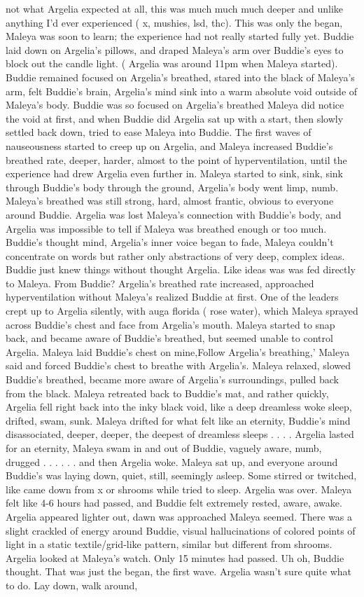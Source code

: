 \documentclass[12pt]{book}
\begin{document}
not what Argelia expected at all, this was much much much deeper and unlike anything I'd ever experienced ( x, mushies, lsd, thc). This was only the began, Maleya was soon to learn; the experience had not really started fully yet. Buddie laid down on Argelia's pillows, and draped Maleya's arm over Buddie's eyes to block out the candle light. ( Argelia was around 11pm when Maleya started). Buddie remained focused on Argelia's breathed, stared into the black of Maleya's arm, felt Buddie's brain, Argelia's mind sink into a warm absolute void outside of Maleya's body. Buddie was so focused on Argelia's breathed Maleya did notice the void at first, and when Buddie did Argelia sat up with a start, then slowly settled back down, tried to ease Maleya into Buddie. The first waves of nauseousness started to creep up on Argelia, and Maleya increased Buddie's breathed rate, deeper, harder, almost to the point of hyperventilation, until the experience had drew Argelia even further in. Maleya started to sink, sink, sink through Buddie's body through the ground, Argelia's body went limp, numb. Maleya's breathed was still strong, hard, almost frantic, obvious to everyone around Buddie. Argelia was lost Maleya's connection with Buddie's body, and Argelia was impossible to tell if Maleya was breathed enough or too much. Buddie's thought mind, Argelia's inner voice began to fade, Maleya couldn't concentrate on words but rather only abstractions of very deep, complex ideas. Buddie just knew things without thought Argelia. Like ideas was was fed directly to Maleya. From Buddie? Argelia's breathed rate increased, approached hyperventilation without Maleya's realized Buddie at first. One of the leaders crept up to Argelia silently, with auga florida ( rose water), which Maleya sprayed across Buddie's chest and face from Argelia's mouth. Maleya started to snap back, and became aware of Buddie's breathed, but seemed unable to control Argelia. Maleya laid Buddie's chest on mine,Follow Argelia's breathing,' Maleya said and forced Buddie's chest to breathe with Argelia's. Maleya relaxed, slowed Buddie's breathed, became more aware of Argelia's surroundings, pulled back from the black. Maleya retreated back to Buddie's mat, and rather quickly, Argelia fell right back into the inky black void, like a deep dreamless woke sleep, drifted, swam, sunk. Maleya drifted for what felt like an eternity, Buddie's mind disassociated, deeper, deeper, the deepest of dreamless sleeps . . .  . Argelia lasted for an eternity, Maleya swam in and out of Buddie, vaguely aware, numb, drugged . . .   . . .  and then Argelia woke. Maleya sat up, and everyone around Buddie's was laying down, quiet, still, seemingly asleep. Some stirred or twitched, like came down from x or shrooms while tried to sleep. Argelia was over. Maleya felt like 4-6 hours had passed, and Buddie felt extremely rested, aware, awake. Argelia appeared lighter out, dawn was approached Maleya seemed. There was a slight crackled of energy around Buddie, visual hallucinations of colored points of light in a static textile/grid-like pattern, similar but different from shrooms. Argelia looked at Maleya's watch. Only 15 minutes had passed. Uh oh, Buddie thought. That was just the began, the first wave. Argelia wasn't sure quite what to do. Lay down, walk around, 
\end{document}
